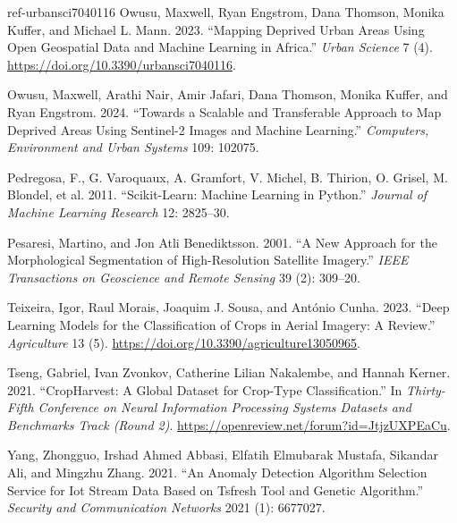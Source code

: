\documentclass[
  journal,
  twocolumn]{IEEEtran}
\newlength{\cslhangindent}
\newlength{\cslentryspacingunit} %
\newenvironment{CSLReferences}[2] %
 {%
  \setlength{\parindent}{0pt}
  \ifodd #1
  \let\oldpar\par
  \def\par{\hangindent=\cslhangindent\oldpar}
  \fi
  \setlength{\parskip}{#2\cslentryspacingunit}
 }%
 {}
\newenvironment{cslreferences}[2]
 {\begin{CSLReferences}{#1}{#2}}
 {\end{CSLReferences}}
\begin{document}
\begin{cslreferences}
\leavevmode\hypertarget{ref-urbansci7040116}{}%
Owusu, Maxwell, Ryan Engstrom, Dana Thomson, Monika Kuffer, and Michael
L. Mann. 2023. ``Mapping Deprived Urban Areas Using Open Geospatial Data
and Machine Learning in Africa.'' \emph{Urban Science} 7 (4).
\url{https://doi.org/10.3390/urbansci7040116}.

\leavevmode\hypertarget{ref-owusu2024towards}{}%
Owusu, Maxwell, Arathi Nair, Amir Jafari, Dana Thomson, Monika Kuffer,
and Ryan Engstrom. 2024. ``Towards a Scalable and Transferable Approach
to Map Deprived Areas Using Sentinel-2 Images and Machine Learning.''
\emph{Computers, Environment and Urban Systems} 109: 102075.

\leavevmode\hypertarget{ref-scikit-learn}{}%
Pedregosa, F., G. Varoquaux, A. Gramfort, V. Michel, B. Thirion, O.
Grisel, M. Blondel, et al. 2011. ``Scikit-Learn: Machine Learning in
Python.'' \emph{Journal of Machine Learning Research} 12: 2825--30.

\leavevmode\hypertarget{ref-pesaresi2001new}{}%
Pesaresi, Martino, and Jon Atli Benediktsson. 2001. ``A New Approach for
the Morphological Segmentation of High-Resolution Satellite Imagery.''
\emph{IEEE Transactions on Geoscience and Remote Sensing} 39 (2):
309--20.

\leavevmode\hypertarget{ref-agriculture13050965}{}%
Teixeira, Igor, Raul Morais, Joaquim J. Sousa, and António Cunha. 2023.
``Deep Learning Models for the Classification of Crops in Aerial
Imagery: A Review.'' \emph{Agriculture} 13 (5).
\url{https://doi.org/10.3390/agriculture13050965}.

\leavevmode\hypertarget{ref-tseng2021cropharvest}{}%
Tseng, Gabriel, Ivan Zvonkov, Catherine Lilian Nakalembe, and Hannah
Kerner. 2021. ``CropHarvest: A Global Dataset for Crop-Type
Classification.'' In \emph{Thirty-Fifth Conference on Neural Information
Processing Systems Datasets and Benchmarks Track (Round 2)}.
\url{https://openreview.net/forum?id=JtjzUXPEaCu}.

\leavevmode\hypertarget{ref-yang2021anomaly}{}%
Yang, Zhongguo, Irshad Ahmed Abbasi, Elfatih Elmubarak Mustafa, Sikandar
Ali, and Mingzhu Zhang. 2021. ``An Anomaly Detection Algorithm Selection
Service for Iot Stream Data Based on Tsfresh Tool and Genetic
Algorithm.'' \emph{Security and Communication Networks} 2021 (1):
6677027.
\end{cslreferences}
\end{document}
